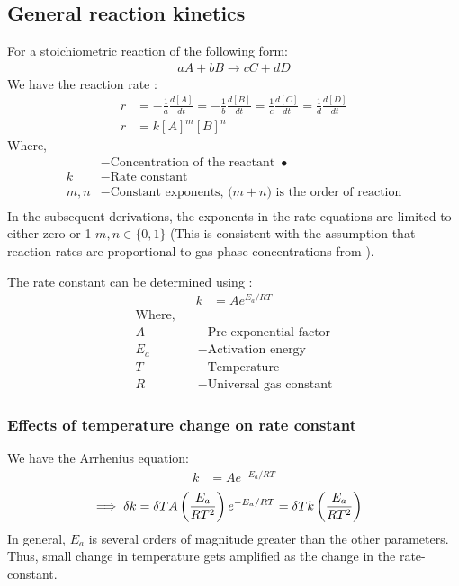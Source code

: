 \subsection{General reaction kinetics}
For a stoichiometric reaction of the following form:
\begin{align*}
    a A + b B \longrightarrow c C + d D
\end{align*}
We have the reaction rate \cite{chem_kine}:
\begin{align}
    r &= -\frac{1}{a} \frac{d [A]}{dt}
       = -\frac{1}{b} \frac{d [B]}{dt}
       = \frac{1}{c}  \frac{d [C]}{dt}
       = \frac{1}{d}  \frac{d [D]}{dt}
       \label{eqn::react_rate}\\
    r &= k [A]^m [B]^n
        \label{eqn::rate}
\end{align}
Where,
\begin{align*}
    [\bullet] &- \text{Concentration of the reactant } \bullet\\
    k &- \text{Rate constant}\\
    m, n &- \text{Constant exponents, ($m+n$) is the order of reaction}\\
\end{align*}
In the subsequent derivations, the exponents in the rate equations are limited
to either zero or 1 $m, n \in \{0, 1\}$ (This is consistent with the assumption
that reaction rates are proportional to gas-phase concentrations from \cite{devarakonda2009model}).

The rate constant can be determined using :
\begin{align}
    k &= A e^{E_a/RT}
    \label{eqn::arrh}
\end{align}
\begin{align*}
    \text{Where,} \quad &\\
    A &- \text{Pre-exponential factor}\\
    E_a &- \text{Activation energy}\\
    T &- \text{Temperature}\\
    R &- \text{Universal gas constant}
\end{align*}
\subsubsection{Effects of temperature change on rate constant}
We have the Arrhenius equation:
\begin{align}
    k &= A e^{-E_a/RT}
\end{align}
\begin{align*}
    \implies \delta k &= \delta T A \left( \frac{E_a}{RT^2} \right) e^{-E_a/RT} = \delta T k \left( \frac{E_a}{RT^2} \right)
\end{align*}
In general, $E_a$ is several orders of magnitude greater than the other
parameters. Thus, small change in temperature gets amplified as the change in
the rate-constant.

